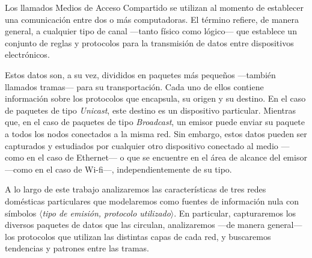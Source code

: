 
Los llamados Medios de Acceso Compartido se utilizan al momento de establecer una comunicación entre dos o más computadoras. El término refiere, de manera general, a cualquier tipo de canal ---tanto físico como lógico--- que establece un conjunto de reglas y protocolos para la transmisión de datos entre dispositivos electrónicos.

Estos datos son, a su vez, divididos en paquetes más pequeños ---también llamados tramas--- para su transportación. Cada uno de ellos contiene información sobre los protocolos que encapsula, su origen y su destino. En el caso de paquetes de tipo \textit{Unicast}, este destino es un dispositivo particular. Mientras que, en el caso de paquetes de tipo \textit{Broadcast}, un emisor puede enviar su paquete a todos los nodos conectados a la misma red. Sin embargo, estos datos pueden ser capturados y estudiados por cualquier otro dispositivo conectado al medio ---como en el caso de Ethernet--- o que se encuentre en el área de alcance del emisor ---como en el caso de Wi-fi---, independientemente de su tipo. 

A lo largo de este trabajo analizaremos las características de tres redes domésticas particulares que modelaremos como fuentes de información nula con símbolos \textit{$\langle$tipo de emisión,  protocolo utilizado$\rangle$}. En particular, capturaremos los diversos paquetes de datos que las circulan, analizaremos ---de manera general--- los protocolos que utilizan las distintas capas de cada red, y buscaremos tendencias y patrones entre las tramas.
 